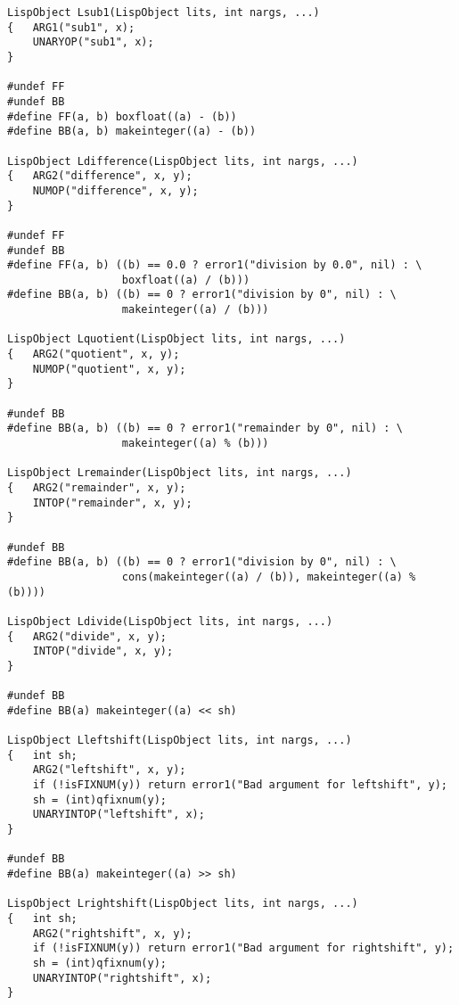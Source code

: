 {\begin{verbatim}
LispObject Lsub1(LispObject lits, int nargs, ...)
{   ARG1("sub1", x);
    UNARYOP("sub1", x);
}

#undef FF
#undef BB
#define FF(a, b) boxfloat((a) - (b))
#define BB(a, b) makeinteger((a) - (b))

LispObject Ldifference(LispObject lits, int nargs, ...)
{   ARG2("difference", x, y);
    NUMOP("difference", x, y);
}

#undef FF
#undef BB
#define FF(a, b) ((b) == 0.0 ? error1("division by 0.0", nil) : \
                  boxfloat((a) / (b)))
#define BB(a, b) ((b) == 0 ? error1("division by 0", nil) : \
                  makeinteger((a) / (b)))

LispObject Lquotient(LispObject lits, int nargs, ...)
{   ARG2("quotient", x, y);
    NUMOP("quotient", x, y);
}

#undef BB
#define BB(a, b) ((b) == 0 ? error1("remainder by 0", nil) : \
                  makeinteger((a) % (b)))

LispObject Lremainder(LispObject lits, int nargs, ...)
{   ARG2("remainder", x, y);
    INTOP("remainder", x, y);
}

#undef BB
#define BB(a, b) ((b) == 0 ? error1("division by 0", nil) : \
                  cons(makeinteger((a) / (b)), makeinteger((a) % (b))))

LispObject Ldivide(LispObject lits, int nargs, ...)
{   ARG2("divide", x, y);
    INTOP("divide", x, y);
}

#undef BB
#define BB(a) makeinteger((a) << sh)

LispObject Lleftshift(LispObject lits, int nargs, ...)
{   int sh;
    ARG2("leftshift", x, y);
    if (!isFIXNUM(y)) return error1("Bad argument for leftshift", y);
    sh = (int)qfixnum(y);
    UNARYINTOP("leftshift", x);
}

#undef BB
#define BB(a) makeinteger((a) >> sh)

LispObject Lrightshift(LispObject lits, int nargs, ...)
{   int sh;
    ARG2("rightshift", x, y);
    if (!isFIXNUM(y)) return error1("Bad argument for rightshift", y);
    sh = (int)qfixnum(y);
    UNARYINTOP("rightshift", x);
}

\end{verbatim}}

